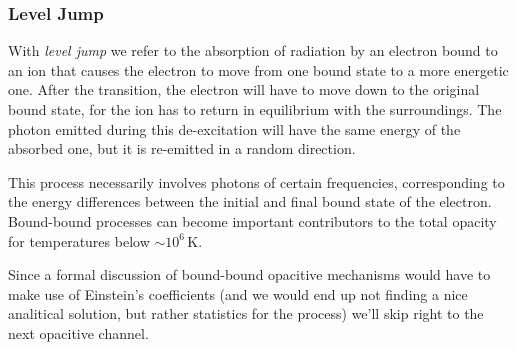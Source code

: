 \subsubsection*{Level Jump}
With \emph{level jump} we refer to the absorption of radiation by an electron bound to an ion that causes the electron to move from one bound state to a more energetic one. After the transition, the electron will have to move down to the original bound state, for the ion has to return in equilibrium with the surroundings. The photon emitted during this de-excitation will have the same energy of the absorbed one, but it is re-emitted in a random direction.
\par This process necessarily involves photons of certain frequencies, corresponding to the energy differences between the initial and final bound state of the electron. Bound-bound processes can become important contributors to the total opacity for temperatures below $\sim 10^{6}\,\text{K}$.
\par Since a formal discussion of bound-bound opacitive mechanisms would have to make use of Einstein's coefficients (and we would end up not finding a nice analitical solution, but rather statistics for the process) we'll skip right to the next opacitive channel.

